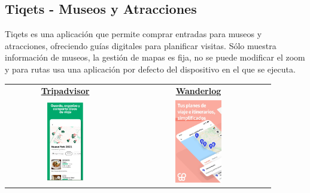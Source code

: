 \subsection{Tiqets - Museos y Atracciones}
Tiqets\cite{tiquets} es una aplicación que permite comprar entradas para museos y atracciones, ofreciendo guías digitales para planificar visitas. Sólo muestra información de museos, la gestión de mapas es fija, no se puede modificar el zoom y para rutas usa una aplicación por defecto del dispositivo en el que se ejecuta.


\begin{table}[h!]
	\centering
	\renewcommand{\arraystretch}{1.5} %
	\begin{tabular}{cc}
	\hline
	\href{https://play.google.com/store/apps/details?id=com.tripadvisor.tripadvisor}{\textbf{Tripadvisor}} & \href{https://play.google.com/store/apps/details?id=com.wanderlog.wanderlog}{\textbf{Wanderlog}} \\
	\includegraphics[width=0.32\textwidth]{img/tripadvisor.png} & \includegraphics[width=0.34\textwidth]{img/wanderlog.png} \\

\end{tabular}
\end{table}
